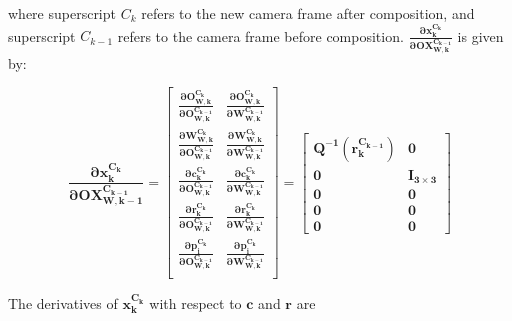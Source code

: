 \noindent where superscript $C_k$ refers to the new camera frame after
composition, and superscript $C_{k-1}$ refers to the camera frame
before composition.
$\boldsymbol{\frac{\partial x_k^{C_k}}{\partial OX_{W,k}^{C_{k-1}}}}$ is
given by:

\begin{equation}
\boldsymbol{\frac{\partial x_{k}^{C_k}}{\partial OX_{W,k-1}^{C_{k-1}}}}=
\begin{bmatrix}
\boldsymbol{\frac{\partial O_{W,k}^{C_k}}{\partial O_{W,k}^{C_{k-1}}}} & 
\boldsymbol{\frac{\partial O_{W,k}^{C_k}}{\partial W_{W,k}^{C_{k-1}}}} \\
\boldsymbol{\frac{\partial W_{W,k}^{C_k}}{\partial O_{W,k}^{C_{k-1}}}} & 
\boldsymbol{\frac{\partial W_{W,k}^{C_k}}{\partial W_{W,k}^{C_{k-1}}}} \\
\boldsymbol{\frac{\partial c_{k}^{C_k}}{\partial O_{W,k}^{C_{k-1}}}} &
\boldsymbol{\frac{\partial c_{k}^{C_k}}{\partial W_{W,k}^{C_{k-1}}}} \\
\boldsymbol{\frac{\partial r_{k}^{C_k}}{\partial O_{W,k}^{C_{k-1}}}} &
\boldsymbol{\frac{\partial r_{k}^{C_k}}{\partial W_{W,k}^{C_{k-1}}}} \\
\boldsymbol{\frac{\partial p_{i}^{C_k}}{\partial O_{W,k}^{C_{k-1}}}} & 
\boldsymbol{\frac{\partial p_{i}^{C_k}}{\partial W_{W,k}^{C_{k-1}}}} \\
\end{bmatrix}= \begin{bmatrix}
\boldsymbol{Q^{-1}(r_k^{C_{k-1}})} & \boldsymbol{0} \\
\boldsymbol{0} & \boldsymbol{I_{3\times 3}} \\
\boldsymbol{0} & \boldsymbol{0} \\
\boldsymbol{0} & \boldsymbol{0} \\
\boldsymbol{0} & \boldsymbol{0} 
\end{bmatrix}
\end{equation}


The derivatives of $\boldsymbol{x_{k}^{C_{k}}}$ with respect to $\boldsymbol{c}$
and $\boldsymbol{r}$ are


